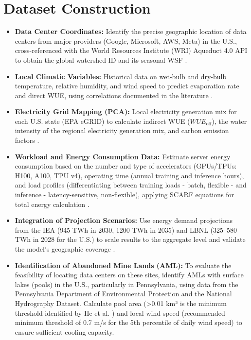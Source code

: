 \documentclass[conference]{IEEEtran}
\begin{document}
\section{Dataset Construction}

\begin{itemize}
\item \textbf{Data Center Coordinates:} Identify the precise geographic location of data centers from major providers (Google, Microsoft, AWS, Meta) in the U.S., cross-referenced with the World Resources Institute (WRI) Aqueduct 4.0 API to obtain the global watershed ID and its seasonal WSF \cite{Wu2025}.

\item \textbf{Local Climatic Variables:} Historical data on wet-bulb and dry-bulb temperature, relative humidity, and wind speed to predict evaporation rate and direct WUE, using correlations documented in the literature \cite{Barnett2026}.

\item \textbf{Electricity Grid Mapping (PCA):} Local electricity generation mix for each U.S. state (EPA eGRID) to calculate indirect WUE ($WUE_{\text{off}}$), the water intensity of the regional electricity generation mix, and carbon emission factors \cite{Siddik2021}.

\item \textbf{Workload and Energy Consumption Data:} Estimate server energy consumption based on the number and type of accelerators (GPUs/TPUs: H100, A100, TPU v4), operating time (annual training and inference hours), and load profiles (differentiating between training loads - batch, flexible - and inference - latency-sensitive, non-flexible), applying SCARF equations for total energy calculation \cite{Wu2025}.

\item \textbf{Integration of Projection Scenarios:} Use energy demand projections from the IEA (945 TWh in 2030, 1200 TWh in 2035) and LBNL (325–580 TWh in 2028 for the U.S.) to scale results to the aggregate level and validate the model's geographic coverage \cite{Yoo2026}.

\item \textbf{Identification of Abandoned Mine Lands (AML):} To evaluate the feasibility of locating data centers on these sites, identify AMLs with surface lakes (pools) in the U.S., particularly in Pennsylvania, using data from the Pennsylvania Department of Environmental Protection and the National Hydrography Dataset. Calculate pool area (>0.01 km² is the minimum threshold identified by He et al. \cite{He2026}) and local wind speed (recommended minimum threshold of 0.7 m/s for the 5th percentile of daily wind speed) to ensure sufficient cooling capacity.
\end{itemize}
\end{document}
